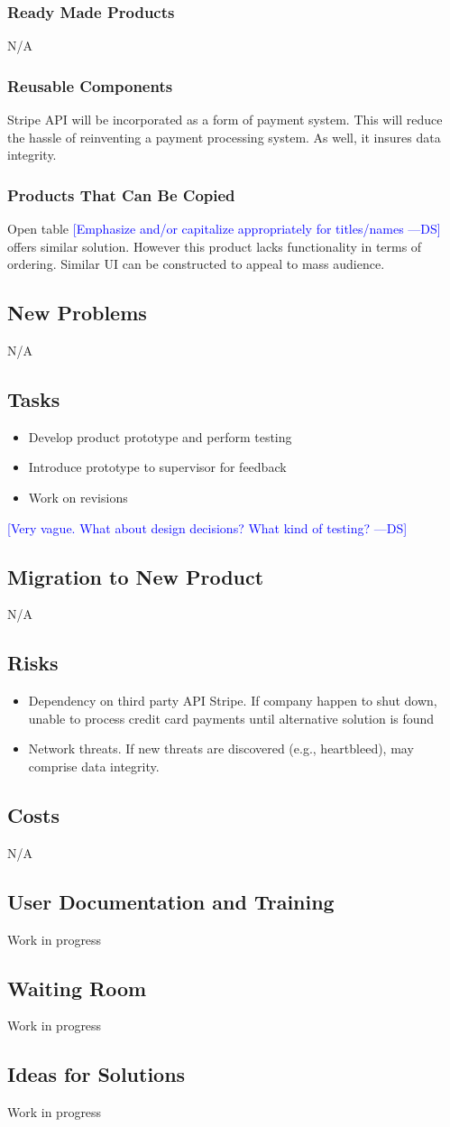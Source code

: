 \documentclass[12pt, titlepage]{article}
\newcommand{\authornote}[3]{\textcolor{#1}{[#3 ---#2]}}
\newcommand{\authornote}[3]{}
\newcommand{\ds}[1]{\authornote{blue}{DS}{#1}}
\begin{document}
\subsubsection{Ready Made Products}
N/A
\subsubsection{Reusable Components}
Stripe API will be incorporated as a form of payment system. This will reduce the hassle of reinventing a payment processing system. As well, it insures data integrity.
 \subsubsection{Products That Can Be Copied} 
Open table \ds{Emphasize and/or capitalize appropriately for titles/names} offers similar solution. However this product lacks functionality in terms of ordering. Similar UI can be constructed to appeal to mass audience.  
\subsection{New Problems}
N/A
\subsection{Tasks}
\begin{itemize}
  \item Develop product prototype and perform testing 
  \item Introduce prototype to supervisor for feedback
  \item 	Work on revisions
\end{itemize}
\ds{Very vague. What about design decisions? What kind of testing?}
\subsection{Migration to New Product}
N/A
\subsection{Risks}
\begin{itemize}
  \item Dependency on third party API Stripe. If company happen to shut down, unable to process credit card payments until alternative solution is found
  \item Network threats. If new threats are discovered (e.g., heartbleed), may comprise data integrity. 
\end{itemize}
\subsection{Costs}
N/A
\subsection{User Documentation and Training}
Work in progress
\subsection{Waiting Room}
Work in progress
\subsection{Ideas for Solutions}
Work in progress
\end{document}
